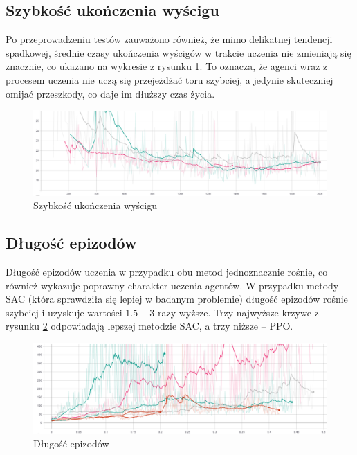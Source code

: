 \documentclass[a4paper,12pt]{article}
\begin{document}
\subsection{Szybkość ukończenia wyścigu}
Po przeprowadzeniu testów zauważono również, że mimo delikatnej tendencji spadkowej, średnie czasy ukończenia wyścigów w trakcie uczenia nie zmieniają się znacznie, co ukazano na wykresie z rysunku \ref{pic:szybkosc}. To oznacza, że agenci wraz z procesem uczenia nie uczą się przejeżdżać toru szybciej, a jedynie skuteczniej omijać przeszkody, co daje im dłuższy czas życia.
\begin{figure}[H]
	\centering
	\includegraphics[width=\textwidth]{szybkosc}
	\caption{Szybkość ukończenia wyścigu}
	\label{pic:szybkosc}
\end{figure}

\subsection{Długość epizodów}
Długość epizodów uczenia w przypadku obu metod jednoznacznie rośnie, co również wykazuje poprawny charakter uczenia agentów. W przypadku metody SAC (która sprawdziła się lepiej w badanym problemie) długość epizodów rośnie szybciej i uzyskuje wartości $1.5-3$ razy wyższe. Trzy najwyższe krzywe z rysunku \ref{pic:length} odpowiadają lepszej metodzie SAC, a trzy niższe -- PPO.
\begin{figure}[H]
	\centering
	\includegraphics[width=\textwidth]{episode_length}
	\caption{Długość epizodów}
	\label{pic:length}
\end{figure}
\end{document}
